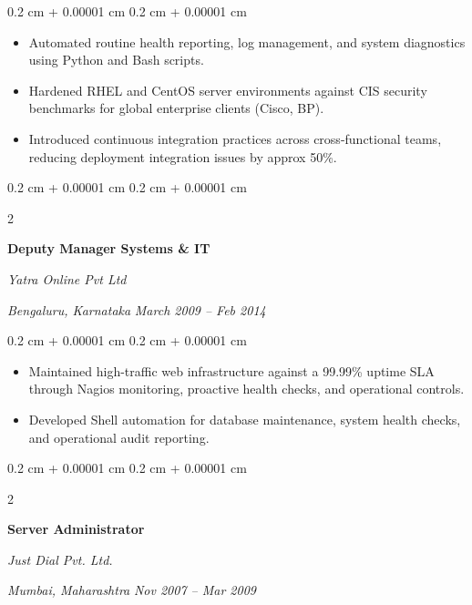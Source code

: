 \documentclass[10pt, letterpaper]{article}
\newenvironment{highlights}{
    \begin{itemize}[
        topsep=0.10 cm,
        parsep=0.10 cm,
        partopsep=0pt,
        itemsep=0pt,
        leftmargin=0.4 cm + 10pt
    ]
}{
    \end{itemize}
} %
\newenvironment{onecolentry}{
    \begin{adjustwidth}{
        0.2 cm + 0.00001 cm
    }{
        0.2 cm + 0.00001 cm
    }
}{
    \end{adjustwidth}
} %
\newenvironment{twocolentry}[2][]{
    \onecolentry
    \def\secondColumn{#2}
    \setcolumnwidth{\fill, 4.5 cm}
    \begin{paracol}{2}
}{
    \switchcolumn \raggedleft \secondColumn
    \end{paracol}
    \endonecolentry
} %
\begin{document}
        \vspace{0.10 cm}
        \begin{onecolentry}
            \begin{highlights}
                \item Automated routine health reporting, log management, and system diagnostics using Python and Bash scripts.
                \item Hardened RHEL and CentOS server environments against CIS security benchmarks for global enterprise clients (Cisco, BP).
                \item Introduced continuous integration practices across cross-functional teams, reducing deployment integration issues by approx 50\%.
            \end{highlights}
        \end{onecolentry}

        \vspace{0.2 cm}
        \begin{twocolentry}{
        \textit{Bengaluru, Karnataka}    
        \textit{March 2009 – Feb 2014}}
            \textbf{Deputy Manager Systems \& IT}
            
            \textit{Yatra Online Pvt Ltd}
        \end{twocolentry}

        \vspace{0.10 cm}
        \begin{onecolentry}
            \begin{highlights}
            \item Maintained high-traffic web infrastructure against a 99.99\% uptime SLA through Nagios monitoring, proactive health checks, and operational controls.
            \item Developed Shell automation for database maintenance, system health checks, and operational audit reporting.
            \end{highlights}
        \end{onecolentry}
    
        \vspace{0.2 cm}
        \begin{twocolentry}{
        \textit{Mumbai, Maharashtra}    
        \textit{Nov 2007 – Mar 2009}}
            \textbf{Server Administrator}
            
            \textit{Just Dial Pvt. Ltd.}
        \end{twocolentry}
\end{document}
